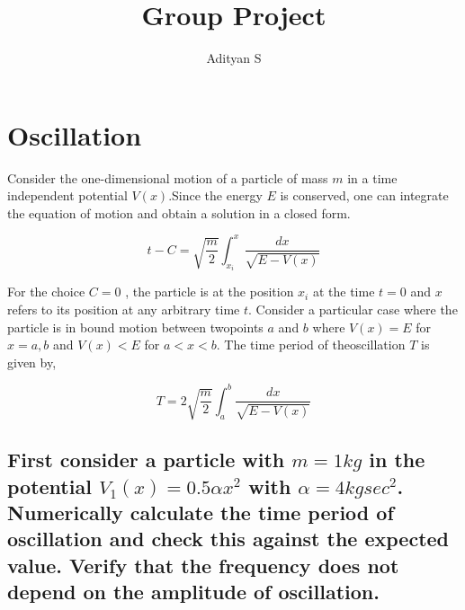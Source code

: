 \documentclass[a4paper,11pt,twoside]{article}
\author{Adityan S}
\date{}
\title{Group Project}
\begin{document}
\maketitle
\tableofcontents

\clearpage

\section{Oscillation}
\label{sec:org8ab8d5c}
Consider the one-dimensional motion of a particle of mass \(m\) in a time independent potential \(V(x)\).Since the energy \(E\) is conserved, one can integrate the equation of motion and obtain a solution in a closed form.

$$
t-C = \sqrt{\frac{m}{2}}\int_{x_i}^x \frac{dx}{\sqrt{E-V(x)}}
$$

For the choice \(C=0\) , the particle is at the position \(x_i\) at the time \(t = 0\) and \(x\) refers to its position at any arbitrary time \(t\). Consider a particular case where the particle is in bound motion between twopoints \(a\) and \(b\) where \(V(x) = E\) for \(x = a, b\) and \(V(x) < E\) for \(a < x < b\). The time period of theoscillation \(T\) is given by,

$$
T = 2 \sqrt{\frac{m}{2}}\int_a^b \frac{dx}{\sqrt{E-V(x)}}
$$

\begin{center}
\end{center}

\subsection{First consider a particle with \(m = 1 kg\) in the potential \(V_1(x) = 0.5 \alpha x^2\) with \(\alpha =4 kg sec^2\). Numerically calculate the time period of oscillation and check this against the expected value. Verify that the frequency does not depend on the amplitude of oscillation.}
\label{sec:org67e05d3}
\end{document}

